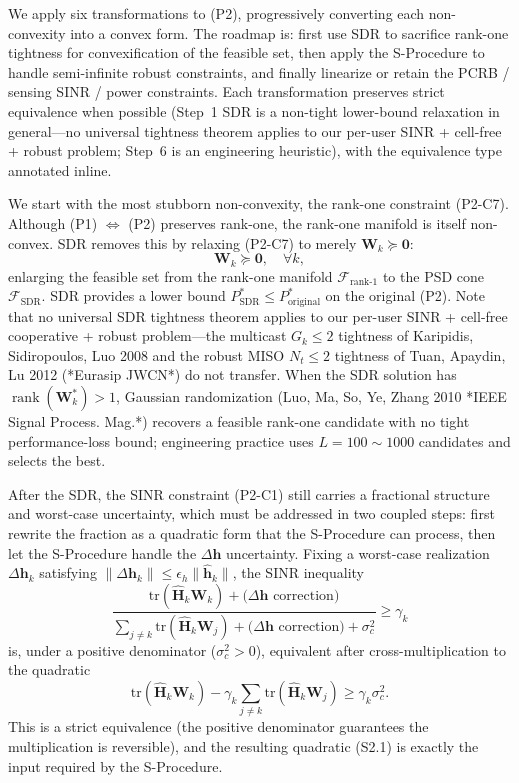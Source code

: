 \documentclass[12pt,a4paper]{article}
\newcommand{\vect}[1]{\mathbf{#1}}
\newcommand{\mat}[1]{\mathbf{#1}}
\newcommand{\tr}{\text{tr}}
\DeclareMathOperator{\rank}{rank}
\begin{document}
We apply six transformations to (P2), progressively converting each non-convexity into a convex form. The roadmap is: first use SDR to sacrifice rank-one tightness for convexification of the feasible set, then apply the S-Procedure to handle semi-infinite robust constraints, and finally linearize or retain the PCRB / sensing SINR / power constraints. Each transformation preserves strict equivalence when possible (Step~1 SDR is a non-tight lower-bound relaxation in general—no universal tightness theorem applies to our per-user SINR + cell-free + robust problem; Step~6 is an engineering heuristic), with the equivalence type annotated inline.

We start with the most stubborn non-convexity, the rank-one constraint (P2-C7). Although (P1) $\Leftrightarrow$ (P2) preserves rank-one, the rank-one manifold is itself non-convex. SDR removes this by relaxing (P2-C7) to merely $\mat{W}_k \succeq \mat{0}$:
\begin{equation}
\mat{W}_k \succeq \mat{0}, \quad \forall k,
\end{equation}
enlarging the feasible set from the rank-one manifold $\mathcal{F}_{\text{rank-1}}$ to the PSD cone $\mathcal{F}_{\text{SDR}}$. SDR provides a lower bound $P_{\text{SDR}}^* \leq P_{\text{original}}^*$ on the original (P2). Note that no universal SDR tightness theorem applies to our per-user SINR + cell-free cooperative + robust problem—the multicast $G_k \leq 2$ tightness of Karipidis, Sidiropoulos, Luo 2008 and the robust MISO $N_t \leq 2$ tightness of Tuan, Apaydin, Lu 2012 (*Eurasip JWCN*) do not transfer. When the SDR solution has $\rank(\mat{W}_k^*) > 1$, Gaussian randomization (Luo, Ma, So, Ye, Zhang 2010 *IEEE Signal Process. Mag.*) recovers a feasible rank-one candidate with no tight performance-loss bound; engineering practice uses $L = 100 \sim 1000$ candidates and selects the best.

After the SDR, the SINR constraint (P2-C1) still carries a fractional structure and worst-case uncertainty, which must be addressed in two coupled steps: first rewrite the fraction as a quadratic form that the S-Procedure can process, then let the S-Procedure handle the $\Delta\vect{h}$ uncertainty. Fixing a worst-case realization $\Delta\vect{h}_k$ satisfying $\|\Delta\vect{h}_k\| \leq \epsilon_h \|\hat{\vect{h}}_k\|$, the SINR inequality
$$
\frac{\tr(\hat{\mat{H}}_k \mat{W}_k) + \text{($\Delta\vect{h}$ correction)}}{\sum_{j\neq k} \tr(\hat{\mat{H}}_k \mat{W}_j) + \text{($\Delta\vect{h}$ correction)} + \sigma_c^2} \geq \gamma_k
$$
is, under a positive denominator ($\sigma_c^2 > 0$), equivalent after cross-multiplication to the quadratic
$$
\tr(\hat{\mat{H}}_k \mat{W}_k) - \gamma_k \sum_{j\neq k} \tr(\hat{\mat{H}}_k \mat{W}_j) \geq \gamma_k \sigma_c^2.
$$
This is a strict equivalence (the positive denominator guarantees the multiplication is reversible), and the resulting quadratic (S2.1) is exactly the input required by the S-Procedure.
\end{document}
